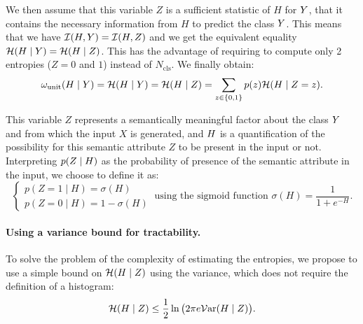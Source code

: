             We then assume that this variable $Z$ is a sufficient statistic \citep[see definition by][]{element} of $H$ for $Y$, \ie that it contains the necessary information from $H$ to predict the class $Y$. This means that we have $\mathcal{I}(H, Y) = \mathcal{I}(H, Z)$ and we get the equivalent equality $\mathcal{H}(H\mid Y)= \mathcal{H}(H\mid Z)$. This has the advantage of requiring to compute only 2 entropies ($Z=0$ and $1$) instead of $N_\mathrm{cls}$. We finally obtain:
            \begin{equation}
                \omega_{\mathrm{unit}}(H\mid Y) = \mathcal{H}(H\mid Y)= \mathcal{H}(H\mid Z) = \sum_{z\in\{0,1\}} p(z) \mathcal{H}(H\mid Z=z).
            \end{equation}

            This variable $Z$ represents a semantically meaningful factor about the class $Y$ and from which the input $X$ is generated, and $H$ is a quantification of the possibility for this semantic attribute $Z$ to be present in the input or not. Interpreting $p(Z \mid H)$ as the probability of presence of the semantic attribute in the input, we choose to define it as:
            \begin{equation}
                \begin{cases}
                    p(Z=1\mid H) = \sigma(H) \\ p(Z=0 \mid H) = 1- \sigma(H)
                \end{cases}
                \  \text{using the sigmoid function } \sigma(H) = \frac{1}{1 + e^{-H}}.
            \end{equation}
            
            
        \paragraph{Using a variance bound for tractability.}

            To solve the problem of the complexity of estimating the entropies, we propose to use a simple bound on $\mathcal{H}(H\mid Z)$ using the variance, which does not require the definition of a histogram:
            \begin{equation}
                \label{shade:variancebound}
                \mathcal{H}(H \mid Z) \le \frac{1}{2}\ln\big(2 \pi e \mathcal{V}\mathrm{ar}(H\mid Z)\big).
            \end{equation}
            
